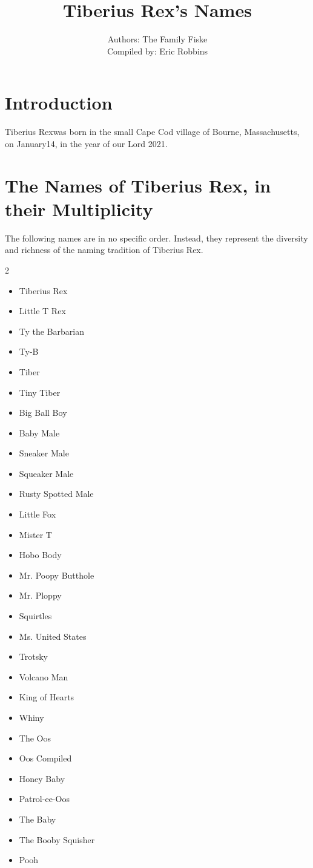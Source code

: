 \documentclass[12pt]{book}
\newcommand{\cat}{Tiberius Rex}
\newcommand{\birthMonth}{January}
\newcommand{\birthDay}{14}
\newcommand{\birthYear}{2021}
\newcommand{\birthPlace}{Bourne, Massachusetts}
\begin{document}
\title{\cat's Names}
\author{Authors: The Family Fiske
	\\Compiled by: Eric Robbins}
\maketitle
\section*{Introduction}
\cat  was born in the small Cape Cod village of \birthPlace, on \birthMonth \birthDay, in the year of our Lord \birthYear.
\section*{The Names of \cat, in their Multiplicity}
The following names are in no specific order. Instead, they represent the diversity and richness of the naming tradition of \cat.

\begin{multicols}{2}
\begin{itemize}
	\item Tiberius Rex
	\item Little T Rex
	\item Ty the Barbarian
	\item Ty-B
	\item Tiber
	\item Tiny Tiber
	\item	Big Ball Boy
  \item Baby Male
	\item Sneaker Male
	\item Squeaker Male
	\item Rusty Spotted Male
	\item Little Fox
	\item Mister T
  \item Hobo Body
	\item Mr. Poopy Butthole
  \item Mr. Ploppy
  \item Squirtles
  \item Ms. United States
	\item Trotsky
	\item Volcano Man
	\item King of Hearts
	\item Whiny
	\item The Oos
  \item Oos Compiled
  \item Honey Baby
  \item Patrol-ee-Oos
  \item The Baby
	\item The Booby Squisher
	\item Pooh

	\end{itemize}
\end{multicols}	 
\end{document}

